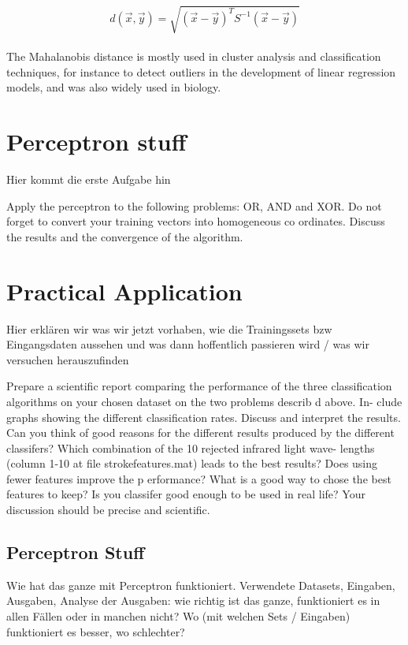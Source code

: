 \documentclass{article}
\begin{document}
\begin{equation}
d(\vec{x},\vec{y}) = \sqrt{(\vec{x}-\vec{y})^TS^{-1}(\vec{x}-\vec{y})}
\end{equation}
\\
The Mahalanobis distance is mostly used in cluster analysis and classification techniques, for instance to detect outliers in the development of linear regression models, and was also widely used in biology.
\pagebreak

\section{Perceptron stuff}

Hier kommt die erste Aufgabe hin

Apply the perceptron to the following problems: OR, AND and XOR. Do not
forget to convert your training vectors into homogeneous co ordinates. Discuss
the results and the convergence of the algorithm. 

\section{Practical Application}

Hier erklären wir was wir jetzt vorhaben, wie die Trainingssets bzw Eingangsdaten aussehen und was dann hoffentlich passieren wird / was wir versuchen herauszufinden

Prepare a scientific report comparing the performance of the three classification
algorithms on your chosen dataset on the two problems describ d above. In-
clude graphs showing the different classification rates. Discuss and interpret the
results. Can you think of good reasons for the different results produced by the
different classifers? Which combination of the 10 rejected infrared light wave-
lengths (column 1-10 at file strokefeatures.mat) leads to the best results?
Does using fewer features improve the p erformance? What is a good way to
chose the best features to keep? Is you classifer good enough to be used in real
life? Your discussion should be precise and scientific. 

\subsection{Perceptron Stuff}

Wie hat das ganze mit Perceptron funktioniert. Verwendete Datasets, Eingaben, Ausgaben, Analyse der Ausgaben: wie richtig ist das ganze, funktioniert es in allen Fällen oder in manchen nicht? Wo (mit welchen Sets / Eingaben) funktioniert es besser, wo schlechter?
\end{document}
